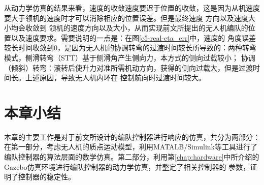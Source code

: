 从动力学仿真的结果来看，速度的收敛速度要迟于位置的收敛，这是因为从机速度要大于领机的速度时才可以消除相应的位置误差。但是最终速度
方向以及速度大小均会收敛到
领机的速度方向以及大小，从而实现前文所提出的无人机编队的位置以及速度要求。需要说明的一点是：在图\ref{c5-real-eta_err}中，速度的
角度误差较长时间收敛到0，是因为无人机的协调转弯的过渡时间较长所导致的：两种转弯模式，侧滑转弯（STT）基于侧滑角产生侧向力，本方式的侧向过载较小；
协调（倾斜）转弯：滚转后使升力对准所需机动方向，获得的侧向过载大，但是过渡时间长。\cite{YuJianQiao2010}上述原因，导致无人机内环在
控制航向时过渡时间较大。

\section{本章小结}
本章的主要工作是对于前文所设计的编队控制器进行响应的仿真，共分为两部分：在第一部分，考虑无人机的质点运动模型，利用MATALB/Simulink等工具进行了
编队控制器的算法层面的数学仿真。第二部分，利用第\ref{chap:hardware}中所介绍的Gazebo仿真环境进行编队控制器的动力学仿真，并整定了相关控制器的
参数，证明了控制器的稳定性。
